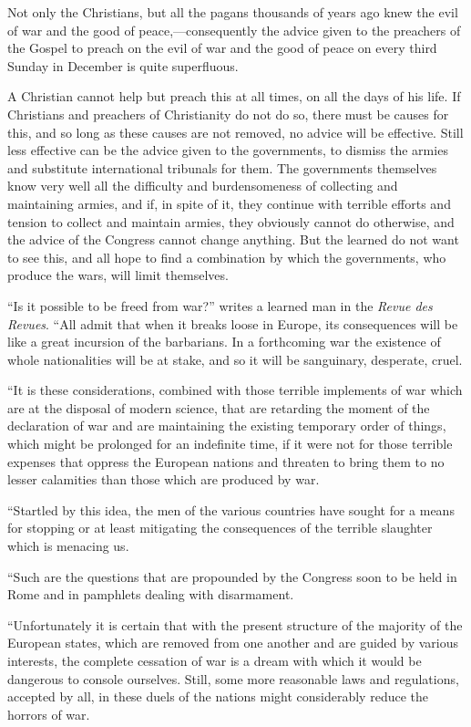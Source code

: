 \documentclass{book}
\begin{document}
Not only the Christians, but all the pagans thousands of years ago knew the evil of war and the good of peace,—consequently the advice given to the preachers of the Gospel to preach on the evil of war and the good of peace on every third Sunday in December is quite superfluous.

A Christian cannot help but preach this at all times, on all the days of his life. If Christians and preachers of Christianity do not do so, there must be causes for this, and so long as these causes are not removed, no advice will be effective. Still less effective can be the advice given to the governments, to dismiss the armies and substitute international tribunals for them. The governments themselves know very well all the difficulty and burdensomeness of collecting and maintaining armies, and if, in spite of it, they continue with terrible efforts and tension to collect and maintain armies, they obviously cannot do otherwise, and the advice of the Congress cannot change anything. But the learned do not want to see this, and all hope to find a combination by which the governments, who produce the wars, will limit themselves.

“Is it possible to be freed from war?” writes a learned man in the \emph{Revue des Revues}. “All admit that when it breaks loose in Europe, its consequences will be like a great incursion of the barbarians. In a forthcoming war the existence of whole nationalities will be at stake, and so it will be sanguinary, desperate, cruel.

“It is these considerations, combined with those terrible implements of war which are at the disposal of modern science, that are retarding the moment of the declaration of war and are maintaining the existing temporary order of things, which might be prolonged for an indefinite time, if it were not for those terrible expenses that oppress the European nations and threaten to bring them to no lesser calamities than those which are produced by war.

“Startled by this idea, the men of the various countries have sought for a means for stopping or at least mitigating the consequences of the terrible slaughter which is menacing us.

“Such are the questions that are propounded by the Congress soon to be held in Rome and in pamphlets dealing with disarmament.

“Unfortunately it is certain that with the present structure of the majority of the European states, which are removed from one another and are guided by various interests, the complete cessation of war is a dream with which it would be dangerous to console ourselves. Still, some more reasonable laws and regulations, accepted by all, in these duels of the nations might considerably reduce the horrors of war.
\end{document}
